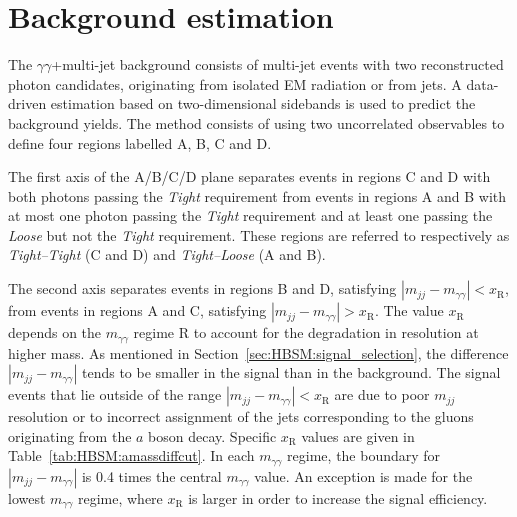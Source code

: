 \section{Background estimation}
\label{sec:HBSM:background_est}
The $\gamma\gamma$+multi-jet background consists of multi-jet events with two reconstructed photon candidates, 
originating from isolated EM radiation or from jets.
A data-driven estimation based on two-dimensional sidebands is used to predict the background yields.
The method consists of using two uncorrelated observables
to define four regions labelled A, B, C and D.

The first axis of the A/B/C/D plane separates events in regions C and D with both photons passing the \textit{Tight} requirement 
from events in regions A and B with at most one photon 
passing the \textit{Tight} requirement and at least one passing the \textit{Loose} but not the \textit{Tight} requirement. 
These regions are referred to respectively as \textit{Tight--Tight} (C and D) and \textit{Tight--Loose} (A and B). 

The second axis separates events in regions B and D, satisfying $|m_{jj}-m_{\gamma\gamma}|< x_\text{R}$, 
from events in regions A and C, satisfying $|m_{jj}-m_{\gamma\gamma}|>x_\text{R}$. 
The value $x_\text{R}$ depends on the $m_{\gamma\gamma}$ regime R to account for the degradation in resolution at higher mass.
As mentioned in Section~\ref{sec:HBSM:signal_selection}, the difference $|m_{jj}-m_{\gamma\gamma}|$ tends to be smaller in the signal than in the background.
The signal events that lie outside of the range $|m_{jj}-m_{\gamma\gamma}|< x_\text{R}$ are due to poor $m_{jj}$ resolution or to incorrect assignment of the jets corresponding 
to the gluons originating from the $a$ boson decay.
Specific $x_\text{R}$ values are given in Table~\ref{tab:HBSM:amassdiffcut}.
In each $m_{\gamma\gamma}$ regime, the boundary for $|m_{jj}-m_{\gamma\gamma}|$ is 0.4 times the central $m_{\gamma\gamma}$ value.
An exception is made for the lowest $m_{\gamma\gamma}$ regime, where $x_\text{R}$ is larger in order to increase the signal efficiency.

